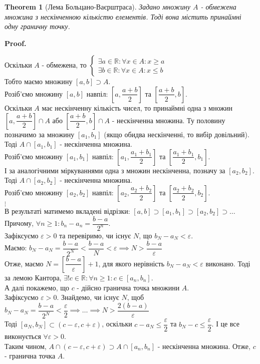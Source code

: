 \documentclass[a4paper, 14pt]{article}
\makeatletter
\def\qed{$\blacksquare$}
\theoremstyle{theoremdd}
\newtheorem{theorem}{Theorem}[subsection]
\theoremstyle{theoremdd}
\theoremstyle{theoremdd}
\theoremstyle{theoremdd}
\theoremstyle{theoremdd}
\theoremstyle{theoremdd}
\theoremstyle{theoremdd}
\theoremstyle{theoremdd}
\renewenvironment{proof}[1][Proof.\\]{\par
\pushQED{\hfill \qed}%
\normalfont \topsep6\p@\@plus6\p@\relax
\trivlist
\item\relax
{\bfseries
#1\@addpunct{.}}\hspace\labelsep\ignorespaces
}{%
\popQED\endtrivlist\@endpefalse
}
\makeatother
\begin{document}
	\begin{theorem}[Лема Больцано-Ваєрштраса]
	Задано множину $A$ - обмежена множина з нескінченною кількістю елементів. Тоді вона містить принаймні одну граничну точку.
	\end{theorem}
	
	\begin{proof}
	Оскільки $A$ - обмежена, то
	$\begin{cases} \exists a \in \mathbb{R}: \forall x \in A: x \geq a \\
	  \exists b \in \mathbb{R}: \forall x \in A: x \leq b \end{cases}$\\
	Тобто маємо множину $[a,b] \supset A$.\\
	Розіб'ємо множину $[a,b]$ навпіл: $\left[a, \dfrac{a+b}{2}\right]$ та $\left[\dfrac{a+b}{2},b \right]$.\\
	Оскільки $A$ має нескінченну кількість чисел, то принаймні одна з множин $\left[a, \dfrac{a+b}{2}\right] \cap A$ або $\left[\dfrac{a+b}{2}, b\right] \cap A$ - нескінченна множина. Ту половину позначимо за множину $[a_1,b_1]$ (якщо обидва нескінченні, то вибір довільний). Тоді $A \cap [a_1,b_1]$ - нескінченна множина.\\
	Розіб'ємо множину $[a_1,b_1]$ навпіл: $\left[a_1, \dfrac{a_1+b_1}{2}\right]$ та $\left[\dfrac{a_1+b_1}{2},b_1 \right]$.\\
	І за аналогічними міркуваннями одна з множин нескінченна, позначу за $[a_2,b_2]$. Тоді $A \cap [a_2,b_2]$ - нескінченна множина.\\
	Розіб'ємо множину $[a_2,b_2]$ навпіл: $\left[a_2, \dfrac{a_2+b_2}{2}\right]$ та $\left[\dfrac{a_2+b_2}{2},b_2 \right]$.\\
	$\vdots$\\
	В результаті матимемо вкладені відрізки: $[a,b] \supset [a_1,b_1] \supset [a_2,b_2] \supset \dots$\\
Причому, $\forall n \geq 1: b_n - a_n = \dfrac{b-a}{2^n}$.\\
	Зафіксуємо $\varepsilon > 0$ та перевіримо, чи існує $N$, що $b_N - a_N < \varepsilon$.\\
	Маємо: $b_N - a_N = \dfrac{b-a}{2^N} < \dfrac{b-a}{N} < \varepsilon \implies N > \dfrac{b-a}{\varepsilon}$\\
	Отже, маємо $N = \left[ \dfrac{b-a}{\varepsilon} \right]+1$, для якого нерівність $b_N-a_N < \varepsilon$ виконано. Тоді за лемою Кантора, $\exists! c \in \mathbb{R}: \forall n \geq 1: c \in [a_n,b_n]$.
	\bigskip \\
	А далі покажемо, що $c$ - дійсно гранична точка множини $A$.\\
	Зафіксуємо $\varepsilon > 0$. Знайдемо, чи існує $N$, щоб $b_N - a_N = \dfrac{b-a}{2^N} < \dfrac{\varepsilon}{2} \implies \dots \implies N > \dfrac{2(b-a)}{\varepsilon}$\\
	Тоді $[a_N,b_N] \subset (c-\varepsilon, c+\varepsilon)$, оскільки $c-a_N \leq \dfrac{\varepsilon}{2}$ та $b_N -c \leq \dfrac{\varepsilon}{2}$. І це все виконується $\forall \varepsilon > 0$.\\
	Таким чином, $A \cap (c-\varepsilon, c+\varepsilon) \supset A \cap [a_n,b_n]$ - нескінченна множина. Отже, $c$ - гранична точка $A$.
	\end{proof}
	
\end{document}
